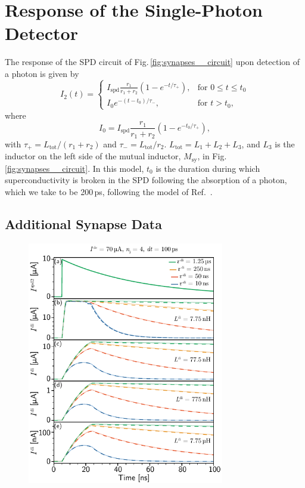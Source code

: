 \documentclass[twocolumn]{article}
\newcommand{\onlinecite}[1]{\hspace{-1 ex} \nocite{#1}\citenum{#1}}
\begin{document}
\section{\label{apx:synapses_model}Response of the Single-Photon Detector}
The response of the SPD circuit of Fig.\,\ref{fig:synapses__circuit} upon detection of a photon is given by
\begin{equation}
\label{eq:syn__spd_current}
I_{\mathrm{2}}(t) = \begin{cases} I_{\mathrm{spd}} \frac{r_{\mathrm{1}}}{r_{\mathrm{1}} + r_{\mathrm{2}}} \left( 1 - e^{-t/\tau_+} \right), & \text{for } 0 \le t \le t_0 \\[10pt]
I_0 e^{-(t-t_0)/\tau_-}, & \text{for } t > t_0,
\end{cases}
\end{equation} 
where
\begin{equation}
\nonumber
I_0 = I_{\mathrm{spd}}\frac{r_{\mathrm{1}}}{r_{\mathrm{1}} + r_{\mathrm{2}}}\left( 1 - e^{-t_0/\tau_+} \right),
\end{equation}
with
$\tau_+ = L_{\mathrm{tot}}/(r_{\mathrm{1}}+r_{\mathrm{2}})$ and $\tau_- = L_{\mathrm{tot}}/r_{\mathrm{2}}$. $L_{\mathrm{tot}} = L_{\mathrm{1}}+L_{\mathrm{2}}+L_{\mathrm{3}}$, and $L_{\mathrm{3}}$ is the inductor on the left side of the mutual inductor, $M_{\mathrm{sy}}$, in Fig.\,\ref{fig:synapses__circuit}. In this model, $t_0$ is the duration during which superconductivity is broken in the SPD following the absorption of a photon, which we take to be 200\,ps, following the model of Ref.\,\onlinecite{yake2007}.

\subsection{\label{apx:synapses_additional}Additional Synapse Data}

\begin{figure}[h!]
\includegraphics[width=8.6cm]{figures/_fig__synapses__comparison__4jj__single_pulse.pdf}
\end{figure}
\end{document}
